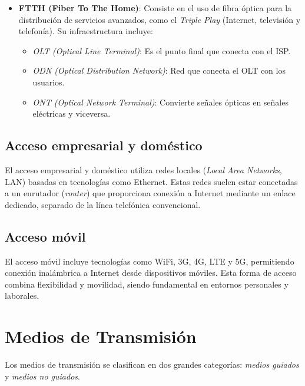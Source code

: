 \documentclass{article}
\begin{document}
\begin{itemize}
    \item \textbf{FTTH (Fiber To The Home)}: Consiste en el uso de fibra óptica para la distribución de servicios avanzados, como el \textit{Triple Play} (Internet, televisión y telefonía). Su infraestructura incluye:
    \begin{itemize}
        \item \textit{OLT (Optical Line Terminal)}: Es el punto final que conecta con el ISP.
        \item \textit{ODN (Optical Distribution Network)}: Red que conecta el OLT con los usuarios.
        \item \textit{ONT (Optical Network Terminal)}: Convierte señales ópticas en señales eléctricas y viceversa.
    \end{itemize}
\end{itemize}

\subsection{Acceso empresarial y doméstico}
El acceso empresarial y doméstico utiliza redes locales (\textit{Local Area Networks}, LAN) basadas en tecnologías como Ethernet. Estas redes suelen estar conectadas a un enrutador (\textit{router}) que proporciona conexión a Internet mediante un enlace dedicado, separado de la línea telefónica convencional.

\subsection{Acceso móvil}
El acceso móvil incluye tecnologías como WiFi, 3G, 4G, LTE y 5G, permitiendo conexión inalámbrica a Internet desde dispositivos móviles. Esta forma de acceso combina flexibilidad y movilidad, siendo fundamental en entornos personales y laborales.

\newpage

\section{Medios de Transmisión}

Los medios de transmisión se clasifican en dos grandes categorías: \textit{medios guiados} y \textit{medios no guiados}.
\end{document}

